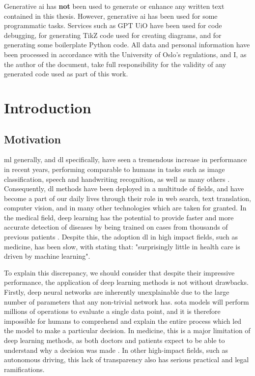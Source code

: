 \documentclass[UKenglish]{uiomasterthesis} %
\theoremstyle{definition}
\begin{document}
\begin{preface}
Generative \ac{ai} has \textbf{not} been used to generate or enhance any written text contained in this thesis. However, generative \ac{ai} has been used for some programmatic tasks. Services such as GPT UiO have been used for code debugging, for generating TikZ code used for creating diagrams, and for generating some boilerplate Python code. All data and personal information have been processed in accordance with the University of Oslo's regulations, and I, as the author of the document, take full responsibility for the validity of any generated code used as part of this work.
\end{preface}

\mainmatter{}



\chapter{Introduction}

\section{Motivation}

\ac{ml} generally, and \ac{dl} specifically, have seen a tremendous increase in performance in recent years, performing comparable to humans in tasks such as image classification, speech and handwriting recognition, as well as many others \cite{performance}. Consequently, \ac{dl} methods have been deployed in a multitude of fields, and have become a part of our daily lives through their role in web search, text translation, computer vision, and in many other technologies which are taken for granted. In the medical field, deep learning has the potential to provide faster and more accurate detection of diseases by being trained on cases from thousands of previous patients \cite{xaisurvey}. Despite this, the adoption \ac{dl} in high impact fields, such as medicine, has been slow, with \cite{dlmed} stating that: "surprisingly little in health care is driven by machine learning".


To explain this discrepancy, we should consider that despite their impressive performance, the application of deep learning methods is not without drawbacks. Firstly, deep neural networks are inherently unexplainable due to the large number of parameters that any non-trivial network has. \ac{sota} models will perform millions of operations to evaluate a single data point, and it is therefore impossible for humans to comprehend and explain the entire process which led the model to make a particular decision. In medicine, this is a major limitation of deep learning methods, as both doctors and patients expect to be able to understand why a decision was made \cite{tingsim}. In other high-impact fields, such as autonomous driving, this lack of transparency also has serious practical and legal ramifications. %
\end{document}
